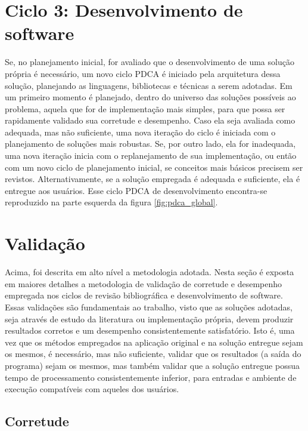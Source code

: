 \documentclass[cic,tc]{iiufrgs}
\begin{document}
\section{Ciclo 3: Desenvolvimento de software}
\label{sec:dev}

Se, no planejamento inicial, for avaliado que o desenvolvimento de uma solução
própria é necessário, um novo ciclo PDCA é iniciado pela arquitetura dessa
solução, planejando as linguagens, bibliotecas e técnicas a serem adotadas.
Em um primeiro momento é planejado, dentro do universo das soluções possíveis
ao problema, aquela que for de implementação mais simples, para que possa ser
rapidamente validado sua corretude e desempenho. Caso ela seja avaliada como
adequada, mas não suficiente, uma nova iteração do ciclo é iniciada com o
planejamento de soluções mais robustas. Se, por outro lado, ela for inadequada,
uma nova iteração inicia com o replanejamento de sua implementação, ou então
com um novo ciclo de planejamento inicial, se conceitos mais básicos precisem
ser revistos. Alternativamente, se a solução empregada é adequada e suficiente,
ela é entregue aos usuários. Esse ciclo PDCA de desenvolvimento encontra-se
reproduzido na parte esquerda da figura \ref{fig:pdca_global}. 

\section{Validação}
\label{sec:test}

Acima, foi descrita em alto nível a metodologia adotada. Nesta seção é exposta
em maiores detalhes a metodologia de validação de corretude e desempenho
empregada nos ciclos de revisão bibliográfica e desenvolvimento de software.
Essas validações são fundamentais ao trabalho, visto que as soluções adotadas,
seja através de estudo da literatura ou implementação própria, devem produzir
resultados corretos e um desempenho consistentemente satisfatório. Isto é, uma
vez que os métodos empregados na aplicação original e na solução entregue sejam
os mesmos, é necessário, mas não suficiente, validar que os resultados (a saída
do programa) sejam os mesmos, mas também validar que a solução entregue possua
tempo de processamento consistentemente inferior, para entradas e ambiente de
execução compatíveis com aqueles dos usuários.

\subsection{Corretude}
\end{document}
